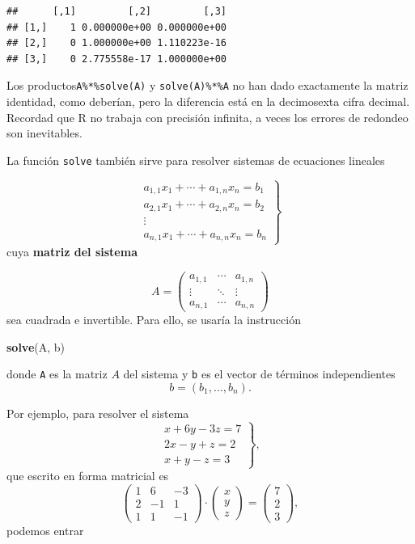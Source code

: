 \documentclass[]{book}
\newenvironment{Shaded}{\begin{snugshade}}{\end{snugshade}}
\newcommand{\KeywordTok}[1]{\textcolor[rgb]{0.13,0.29,0.53}{\textbf{#1}}}
\newcommand{\NormalTok}[1]{#1}
\theoremstyle{definition}
\theoremstyle{definition}
\theoremstyle{definition}
\theoremstyle{remark}
\begin{document}
\begin{verbatim}
##      [,1]         [,2]         [,3]
## [1,]    1 0.000000e+00 0.000000e+00
## [2,]    0 1.000000e+00 1.110223e-16
## [3,]    0 2.775558e-17 1.000000e+00
\end{verbatim}

Los productos\texttt{A\%*\%solve(A)} y \texttt{solve(A)\%*\%A} no han dado exactamente la matriz identidad, como deberían, pero la diferencia está en la decimosexta cifra decimal. Recordad que R no trabaja con precisión infinita, a veces los errores de redondeo son inevitables.

La función \texttt{solve} también sirve para resolver sistemas de ecuaciones lineales

\[
\left.\begin{array}{c}
a_{1,1} x_1+\cdots +a_{1,n}x_n = b_1 \\
a_{2,1} x_1+\cdots +a_{2,n}x_n = b_2 \\
\vdots\qquad\ \\
a_{n,1} x_1+\cdots +a_{n,n}x_n = b_n
\end{array}
\right\}
\]
cuya \textbf{matriz del sistema}

\[
A=\left(\begin{array}{ccc}
a_{1,1} & \cdots & a_{1,n} \\
\vdots & \ddots & \vdots\\
a_{n,1} & \cdots & a_{n,n}
\end{array}
\right)
\]
sea cuadrada e invertible. Para ello, se usaría la instrucción

\begin{Shaded}
\begin{Highlighting}[]
\KeywordTok{solve}\NormalTok{(A, b)}
\end{Highlighting}
\end{Shaded}

donde \texttt{A} es la matriz \(A\) del sistema y \texttt{b} es el vector de términos independientes
\[
b=(b_1, \ldots, b_{n}).
\]

Por ejemplo, para resolver el sistema
\[
\left.\begin{array}{r}
x+6y-3z = 7 \\
2x-y+z = 2\\
x+y-z = 3
\end{array}
\right\},
\]
que escrito en forma matricial es
\[
\left(\begin{array}{ccc}
1 & 6 & -3 \\ 2 & -1 & 1 \\ 1 & 1 & -1\end{array}
\right)\cdot 
\left(\begin{array}{c} x \\ y \\ z \end{array}
\right)=
\left(\begin{array}{c} 7 \\ 2 \\ 3 \end{array}
\right), 
\]
podemos entrar
\end{document}
